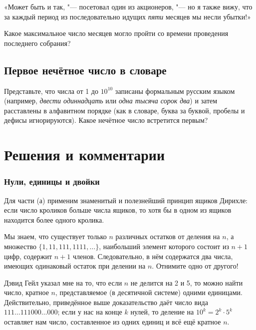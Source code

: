 \documentclass[twoside]{book}
\makeatletter
\newcommand{\rindex}[2][\imki@jobname]{%
  \index[#1]{\detokenize{#2}}%
}
\makeatother
\begin{document}
«Может быть и так, "--- посетовал один из акционеров, "--- но я также вижу, что за каждый период из последовательно идущих \emph{пяти} месяцев мы несли убытки!»

Какое максимальное число месяцев могло пройти со времени проведения последнего собрания?

\subsection*{Первое нечётное число в словаре}%
\rindex{Первое нечётное число в словаре}

Представьте, что числа от 1 до $10^{10}$ записаны формальным русским языком (например, \emph{двести одиннадцать} или \emph{одна тысяча сорок два}) и затем расставлены в алфавитном порядке (как в словаре, буква за буквой, пробелы и дефисы игнорируются).
Какое нечётное число встретится первым?



\section*{Решения и комментарии}

\subsubsection*{Нули, единицы и двойки}%

Для части (а) применим знаменитый и полезнейший принцип ящиков Дирихле:
если число кроликов больше числа ящиков, то хотя бы в одном из ящиков находится более одного кролика.

Мы знаем, что существует только $n$ различных остатков от деления на $n$, а множество $\{1, 11, 111, 1111,\dots\}$, наибольший элемент которого состоит из $n+1$ цифр, содержит $n+1$ членов.
Следовательно, в нём содержатся два числа, имеющих одинаковый остаток при делении на $n$.
Отнимите одно от другого!
\heart

Дэвид Гейл %
указал мне на то, %
что если $n$ не делится на 2 и 5, то можно найти число, кратное $n$, представляемое (в десятичной системе) одними единицами.
Действительно, приведённое выше доказательство даёт число вида $111\dots111000\dots000$; 
если у нас на конце $k$ нулей, то деление на $10^k=2^k\cdot 5^k$ оставляет нам число, составленное из одних единиц и всё ещё кратное $n$.
\end{document}
